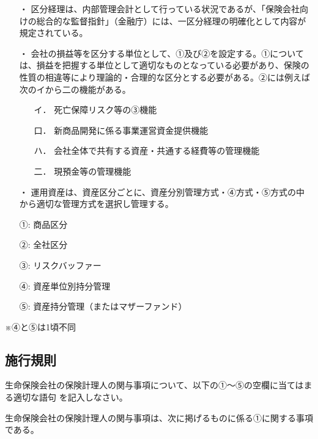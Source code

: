 \documentclass[report,gutter=10mm,fore-edge=10mm,uplatex,dvipdfmx]{jlreq}
\begin{document}
\begin{itemize}
\item[・] 区分経理は、内部管理会計として行っている状況であるが、「保険会社向けの総合的な監督指針」（金融庁）には、一区分経理の明確化として内容が規定されている。
\item[・] 会社の損益等を区分する単位として、①及び②を設定する。①については、損益を把握する単位として適切なものとなっている必要があり、保険の性質の相違等により理論的・合理的な区分とする必要がある。②には例えば次のイから二の機能がある。
\begin{itemize}
\item[イ．] 死亡保障リスク等の③機能
\item[口．] 新商品開発に係る事業運営資金提供機能
\item[ハ．] 会社全体で共有する資産・共通する経費等の管理機能
\item[二．] 現預金等の管理機能
\end{itemize}
\item[・]運用資産は、資産区分ごとに、資産分別管理方式・④方式・⑤方式の中から適切な管理方式を選択し管理する。
\end{itemize}

\answer{}
\begin{itemize}
\item[①:] 商品区分
\item[②:] 全社区分
\item[③:] リスクバッファー
\item[④:] 資産単位別持分管理
\item[⑤:] 資産持分管理（またはマザーファンド）
\end{itemize}
※④と⑤は1頃不同



\subsection{施行規則}


生命保険会社の保険計理人の関与事項について、以下の①～⑤の空欄に当てはまる適切な語句
を記入しなさい。

生命保険会社の保険計理人の関与事項は、次に掲げるものに係る①に関する事項である。
\end{document}
